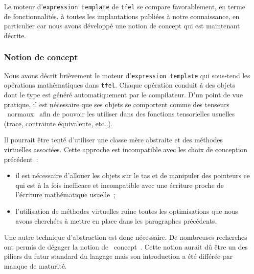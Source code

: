 \documentclass[rectoverso,pleiades,pstricks,leqno,anti]{texmf/note_technique_2010}
\newcommand{\tfel}{\texttt{tfel}}
\def\ifmonospace{\ifdim\fontdimen3\font=0pt }
\def\cpp{%
\ifmonospace%
    C++%
\else%
    C\kern-.1667em\raise.30ex\hbox{\smaller{++}}%
\fi%
\spacefactor1000 }
\begin{document}
Le moteur d'\texttt{expression template} de \tfel{} se compare
favorablement, en terme de fonctionnalités, à toutes les implantations
publiées à notre connaissance, en particulier car nous avons développé
une notion de concept qui est maintenant décrite.

\subsubsection{Notion de concept}

Nous avons décrit brièvement le moteur d'\texttt{expression template}
qui sous-tend les opérations mathématiques dans \tfel{}. Chaque
opération conduit à des objets dont le type est généré automatiquement
par le compilateur. D'un point de vue pratique, il est nécessaire que
ses objets se comportent comme des tenseurs \og~normaux~\fg{} afin de
pouvoir les utiliser dans des fonctions tensorielles usuelles (trace,
contrainte équivalente, etc..).

Il pourrait être tenté d'utiliser une classe mère abstraite et des
méthodes virtuelles associées. Cette approche est incompatible avec
les choix de conception précédent~:
\begin{itemize}
\item il est nécessaire d'allouer les objets sur le tas et de
  manipuler des pointeurs ce qui est à la fois inefficace et
  incompatible avec une écriture proche de l'écriture mathématique
  usuelle~;
\item l'utilisation de méthodes virtuelles ruine toutes les
  optimisations que nous avons cherchées à mettre en place dans les
  paragraphes précédents.
\end{itemize}

Une autre technique d'abstraction est donc nécessaire. De nombreuses
recherches ont permis de dégager la notion de \og~concept~\fg{}. Cette
notion aurait dû être un des piliers du futur standard du langage
\cpp{} mais son introduction a été différée par manque de maturité.
\end{document}
